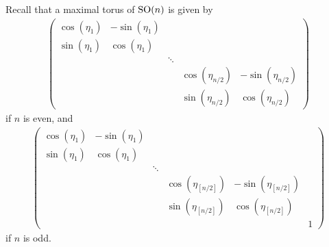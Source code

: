 \documentclass[10pt,a4paper]{amsart}
\numberwithin{equation}{section}
\begin{document}
Recall that a maximal torus of ${\rm SO}(n)$ is given by
\begin{gather*}
 \left(
\begin{matrix}
\cos(\eta_1) & -\sin(\eta_1) & & & \\
\sin(\eta_1) & \cos(\eta_1) & & & \\
 & & \ddots & & \\
 & & & \cos(\eta_{n/2}) & -\sin(\eta_{n/2}) \\
 & & & \sin(\eta_{n/2}) & \cos(\eta_{n/2})
\end{matrix}
\right)
\end{gather*}
if $n$ is even, and
\begin{gather*}
 \left(
\begin{matrix}
\cos(\eta_1) & -\sin(\eta_1) & & & & \\
\sin(\eta_1) & \cos(\eta_1) & & & & \\
 & & \ddots & & &\\
 & & & \cos(\eta_{[n/2]}) & -\sin(\eta_{[n/2]}) & \\
 & & & \sin(\eta_{[n/2]}) & \cos(\eta_{[n/2]}) & \\
 & & & & & 1
\end{matrix}
\right)
\end{gather*}
if $n$ is odd.
\end{document}
